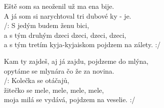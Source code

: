 
\ve{}
Eště som sa neoženil už ma ena bije.\\
A já som si narychtoval tri dubové ky - je.\\
/: S jedým budem ženu bici,\\
a s tým druhým dzeci dzeci, dzeci, dzeci,\\
a s tým tretím kyja-kyjaiskom pojdzem na zálety. :/

\ve{}
Kam ty zajdeš, aj já zajdu, pojdzeme do mlýna,\\
opytáme se mlynára čo že za novina.\\
/: Kolečka se otáčajů,\\
žitečko se mele, mele, mele, mele,\\
moja milá se vydává, pojdzem na veselie. :/



\esong{}